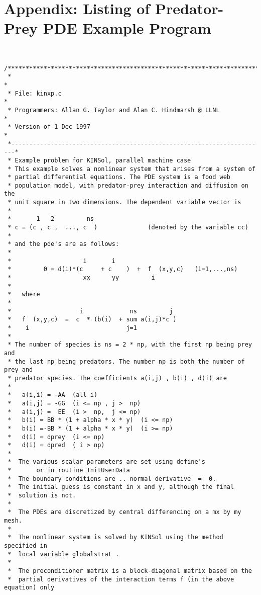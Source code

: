 \section{Appendix: Listing of Predator-Prey PDE Example Program}
\small
\begin{verbatim}

 /************************************************************************
 *                                                                       *
 * File: kinxp.c                                                         *
 * Programmers: Allan G. Taylor and Alan C. Hindmarsh @ LLNL             *
 * Version of 1 Dec 1997                                                 *
 *-----------------------------------------------------------------------*
 * Example problem for KINSol, parallel machine case                  
 * This example solves a nonlinear system that arises from a system of  
 * partial differential equations. The PDE system is a food web         
 * population model, with predator-prey interaction and diffusion on the
 * unit square in two dimensions. The dependent variable vector is      
 * 
 *       1   2         ns
 * c = (c , c ,  ..., c  )              (denoted by the variable cc)
 * 
 * and the pde's are as follows:
 *
 *                    i       i      
 *         0 = d(i)*(c     + c    )  +  f  (x,y,c)   (i=1,...,ns)
 *                    xx      yy         i
 *
 *   where
 *
 *                   i             ns         j  
 *   f  (x,y,c)  =  c  * (b(i)  + sum a(i,j)*c )
 *    i                           j=1
 *
 * The number of species is ns = 2 * np, with the first np being prey and
 * the last np being predators. The number np is both the number of prey and
 * predator species. The coefficients a(i,j) , b(i) , d(i) are
 *
 *   a(i,i) = -AA  (all i)
 *   a(i,j) = -GG  (i <= np , j >  np)
 *   a(i,j) =  EE  (i >  np,  j <= np)
 *   b(i) = BB * (1 + alpha * x * y)  (i <= np)
 *   b(i) =-BB * (1 + alpha * x * y)  (i >= np)
 *   d(i) = dprey  (i <= np)
 *   d(i) = dpred  ( i > np)
 *
 *  The various scalar parameters are set using define's 
 *       or in routine InitUserData
 *  The boundary conditions are .. normal derivative  =  0.
 *  The initial guess is constant in x and y, although the final
 *  solution is not.
 *
 *  The PDEs are discretized by central differencing on a mx by my mesh.
 * 
 *  The nonlinear system is solved by KINSol using the method specified in
 *  local variable globalstrat .
 *
 *  The preconditioner matrix is a block-diagonal matrix based on the
 *  partial derivatives of the interaction terms f (in the above equation) only

\end{verbatim}
